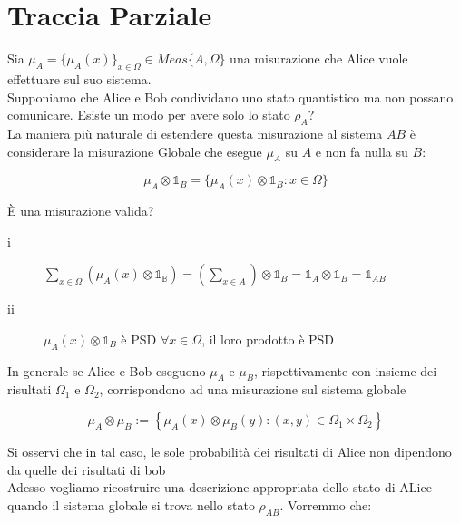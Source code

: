 \documentclass{report}
\begin{document}
\newpage
\section{Traccia Parziale}
Sia $\mu_A=\{\mu_A(x)\}_{x\in\Omega} \in \textit{Meas}\{A,\Omega\}$ una misurazione che Alice vuole effettuare sul suo sistema.\\
Supponiamo che Alice e Bob condividano uno stato quantistico ma non possano comunicare. Esiste un modo per avere solo lo stato $\rho_A$?
\medskip\\
La maniera più naturale di estendere questa misurazione al sistema $AB$ è considerare la misurazione Globale che esegue 
$\mu_A$ su $A$ e non fa nulla su $B$:

$$
    \mu_A\otimes\mathbb{1}_B=\{\mu_A(x)\otimes\mathbb{1}_B:x\in\Omega\}
$$

È una misurazione valida?
\begin{description}
    \item[i]    $\sum_{x\in\Omega}(\mu_A(x)\otimes\mathbb{1_B})=\left(\sum_{x\in A}\right)\otimes\mathbb{1}_B =\mathbb{1}_A\otimes\mathbb{1}_B=\mathbb{1}_{AB}$
    \item[ii]   $\mu_A(x)\otimes\mathbb{1}_B$ è PSD $\forall x \in \Omega$, il loro prodotto è PSD
\end{description}

In generale se Alice e Bob eseguono $\mu_A$ e $\mu_B$, rispettivamente con insieme dei risultati $\Omega_1$ e $\Omega_2$, corrispondono ad una misurazione sul sistema globale

$$
    \mu_A\otimes\mu_B:=\left\{ \mu_A(x)\otimes\mu_B(y) :(x,y)\in \Omega_1 \times\Omega_2 \right\}
$$

Si osservi che in tal caso, le sole probabilità dei risultati di Alice non dipendono da quelle dei risultati di bob
\medskip\\
Adesso vogliamo ricostruire una descrizione appropriata dello stato di ALice quando il sistema globale si trova nello stato $\rho_{AB}$. Vorremmo che:
\end{document}
